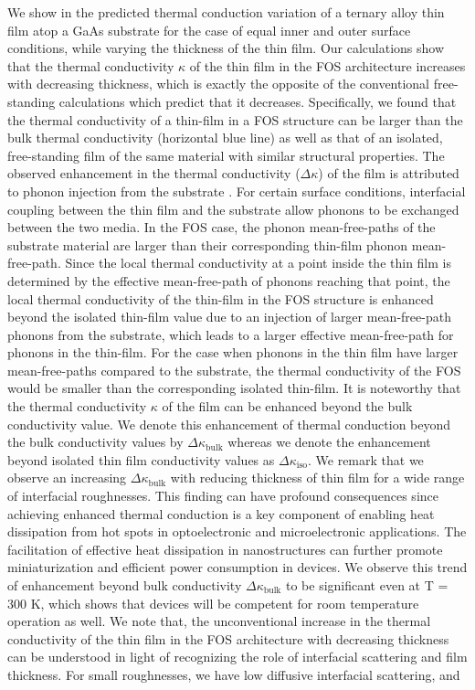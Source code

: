  \par We show in  the predicted thermal conduction variation of a ternary alloy  thin film atop a GaAs substrate for the case of equal inner and outer surface conditions, while varying the thickness of the  thin film. Our calculations show that the thermal conductivity $\kappa$ of the thin film in the FOS architecture increases with decreasing thickness, which is exactly the opposite of the conventional free-standing calculations \cite{RN204,ownTF} which predict that it decreases. Specifically, we found that the thermal conductivity of a thin-film in a FOS structure can be larger than the bulk thermal conductivity (horizontal blue line) as well as that of an isolated, free-standing film of the same material with similar structural properties. The observed enhancement in the thermal conductivity ($\Delta\kappa$) of the  film is attributed to phonon injection from the substrate \cite{ownCoupling1}. For certain surface conditions, interfacial coupling between the thin film and the substrate allow phonons to be exchanged between the two media. In the FOS case, the phonon mean-free-paths of the substrate material are larger than their corresponding thin-film phonon mean-free-path. Since the local thermal conductivity at a point inside the thin film is determined by the effective mean-free-path of phonons reaching that point, the local thermal conductivity of the thin-film in the FOS structure is enhanced beyond the isolated thin-film value due to an injection of larger mean-free-path phonons from the substrate, which leads to a larger effective mean-free-path for phonons in the thin-film. For the case when phonons in the thin film have larger mean-free-paths compared to the substrate, the thermal conductivity of the FOS would be smaller than the corresponding isolated thin-film. It is noteworthy that the thermal conductivity $\kappa$ of the film can be enhanced beyond the  bulk conductivity value. We denote this enhancement of thermal conduction beyond the bulk conductivity values by $\Delta\kappa_{\text{bulk}}$ whereas we denote the enhancement beyond isolated thin film conductivity values as $\Delta\kappa_{\text{iso}}$. We remark that we observe an increasing $\Delta\kappa_{\text{bulk}}$ with reducing thickness of thin film for a wide range of interfacial roughnesses. This finding can have profound consequences since achieving enhanced thermal conduction is a key component of enabling heat dissipation from hot spots in optoelectronic and microelectronic applications. The facilitation of effective heat dissipation in nanostructures can further promote miniaturization and efficient power consumption in devices. We observe this trend of enhancement beyond bulk conductivity $\Delta\kappa_{\text{bulk}}$ to be significant even at \gls{T} = 300 K, which shows that devices will be competent for room temperature operation as well. We note that, the unconventional increase in the thermal conductivity of the thin film in the FOS architecture with decreasing thickness can be understood in light of recognizing the role of interfacial scattering and film thickness. For small roughnesses, we have low diffusive interfacial scattering, and 
